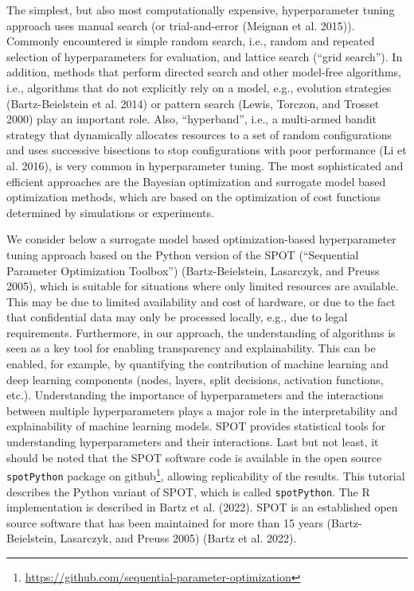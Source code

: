 \documentclass[
  letterpaper,
  DIV=11,
  numbers=noendperiod]{scrreprt}
\begin{document}
The simplest, but also most computationally expensive, hyperparameter
tuning approach uses manual search (or trial-and-error (Meignan et al.
2015)). Commonly encountered is simple random search, i.e., random and
repeated selection of hyperparameters for evaluation, and lattice search
(``grid search''). In addition, methods that perform directed search and
other model-free algorithms, i.e., algorithms that do not explicitly
rely on a model, e.g., evolution strategies (Bartz-Beielstein et al.
2014) or pattern search (Lewis, Torczon, and Trosset 2000) play an
important role. Also, ``hyperband'', i.e., a multi-armed bandit strategy
that dynamically allocates resources to a set of random configurations
and uses successive bisections to stop configurations with poor
performance (Li et al. 2016), is very common in hyperparameter tuning.
The most sophisticated and efficient approaches are the Bayesian
optimization and surrogate model based optimization methods, which are
based on the optimization of cost functions determined by simulations or
experiments.

We consider below a surrogate model based optimization-based
hyperparameter tuning approach based on the Python version of the SPOT
(``Sequential Parameter Optimization Toolbox'') (Bartz-Beielstein,
Lasarczyk, and Preuss 2005), which is suitable for situations where only
limited resources are available. This may be due to limited availability
and cost of hardware, or due to the fact that confidential data may only
be processed locally, e.g., due to legal requirements. Furthermore, in
our approach, the understanding of algorithms is seen as a key tool for
enabling transparency and explainability. This can be enabled, for
example, by quantifying the contribution of machine learning and deep
learning components (nodes, layers, split decisions, activation
functions, etc.). Understanding the importance of hyperparameters and
the interactions between multiple hyperparameters plays a major role in
the interpretability and explainability of machine learning models. SPOT
provides statistical tools for understanding hyperparameters and their
interactions. Last but not least, it should be noted that the SPOT
software code is available in the open source \texttt{spotPython}
package on github\footnote{\url{https://github.com/sequential-parameter-optimization}},
allowing replicability of the results. This tutorial describes the
Python variant of SPOT, which is called \texttt{spotPython}. The R
implementation is described in Bartz et al. (2022). SPOT is an
established open source software that has been maintained for more than
15 years (Bartz-Beielstein, Lasarczyk, and Preuss 2005) (Bartz et al.
2022).
\end{document}
